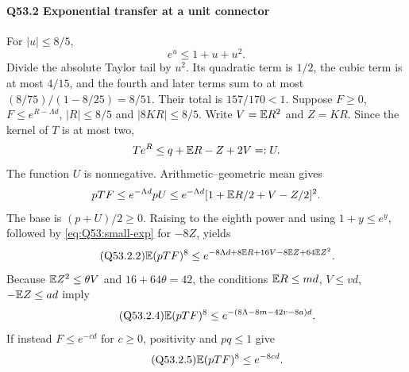 \paragraph{Q53.2 Exponential transfer at a unit connector}\label{part:Q53.2}
For $|u|\le\allowbreak 8/5$,
\begin{equation}\tag{Q53.2.1}\label{eq:Q53:small-exp}
 e^u\le1+u+u^2.
\end{equation}
Divide the absolute Taylor tail by $u^2$. Its quadratic term is $1/2$,
the cubic term is at most $4/15$, and the fourth and later terms sum to at
most $(8/75)/(1-8/25)=\allowbreak 8/51$. Their total is $157/170<\allowbreak 1$.
Suppose $F\ge\allowbreak 0$, $F\le\allowbreak  e^{R-\Lambda d}$, $|R|\le\allowbreak 8/5$ and $|8KR|\le\allowbreak 8/5$.
Write $V=\allowbreak \mathbb E R^2$ and $Z=\allowbreak KR$. Since the kernel of $T$ is at most two,
\[
 Te^R\le q+\mathbb E R-Z+2V=:U.
\]
The function $U$ is nonnegative. Arithmetic--geometric mean gives
\[
 pTF\le e^{-\Lambda d}pU
 \le e^{-\Lambda d}[1+\mathbb E R/2+V-Z/2]^2.
\]
The base is $(p+U)/2\ge\allowbreak 0$. Raising to the eighth power and using
$1+y\le\allowbreak  e^y$, followed by \eqref{eq:Q53:small-exp} for $-8Z$, yields
\begin{equation}\tag{Q53.2.2}\label{eq:Q53:transfer}
 \mathbb E(pTF)^8\le
 e^{-8\Lambda d+8\mathbb E R+16V-8\mathbb E Z+64\mathbb E Z^2}.
\end{equation}
Because $\mathbb E Z^2\le\allowbreak \theta V$ and $16+64\theta=\allowbreak 42$, the conditions
$\mathbb E R\le\allowbreak  md$, $V\le\allowbreak  vd$, $-\mathbb E Z\le\allowbreak  ad$ imply
\begin{equation}\tag{Q53.2.4}\label{eq:Q53:budget}
 \mathbb E(pTF)^8\le e^{-(8\Lambda-8m-42v-8a)d}.
\end{equation}
If instead $F\le\allowbreak  e^{-cd}$ for $c\ge\allowbreak 0$, positivity and $pq\le\allowbreak 1$ give
\begin{equation}\tag{Q53.2.5}\label{eq:Q53:pointwise}
 \mathbb E(pTF)^8\le e^{-8cd}.
\end{equation}

